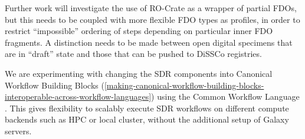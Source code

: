 Further work will investigate the use of RO-Crate as a wrapper of
partial FDOs, but this needs to be coupled with more flexible FDO types
as profiles, in order to restrict ``impossible'' ordering of steps
depending on particular inner FDO fragments. A distinction needs to be
made between open digital specimens that are in ``draft'' state and
those that can be pushed to DiSSCo registries.

We are experimenting with changing the SDR components into Canonical
Workflow Building Blocks \cite{Soiland-Reyes 2022a}
(\vref{making-canonical-workflow-building-blocks-interoperable-across-workflow-languages}) 
using the Common Workflow Language \cite{Crusoe 2022}. This gives
flexibility to scalably execute SDR workflows on different compute
backends such as HPC or local cluster, without the additional setup of
Galaxy servers.

